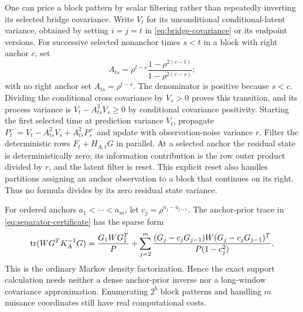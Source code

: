One can price a block pattern by scalar filtering rather than repeatedly
inverting its selected bridge covariance. Write $V_t$ for its unconditional
conditional-latent variance, obtained by setting $i=j=t$ in
\eqref{eq:bridge-covariance} or its endpoint versions. For successive selected
nonanchor times $s<t$ in a block with right anchor $c$, set
\begin{equation}\label{eq:bridge-transition}
 A_{ts}=\rho^{t-s}\frac{1-\rho^{2(c-t)}}{1-\rho^{2(c-s)}};
\end{equation}
with no right anchor set $A_{ts}=\rho^{t-s}$. The denominator is positive
because $s<c$. Dividing the conditional cross covariance by $V_s>0$
proves this transition, and its process variance is
$V_t-A_{ts}^2V_s\ge0$ by conditional covariance positivity. Starting the
first selected time at prediction variance $V_t$, propagate
$P_t^-=V_t-A_{ts}^2V_s+A_{ts}^2P_s^+$ and update with observation-noise
variance $r$. Filter the deterministic rows $F_t+H_{A,t}G$ in parallel.
At a selected anchor the residual state is deterministically zero; its
information contribution is the row outer product divided by $r$, and the
latent filter is reset. This explicit reset also handles partitions assigning
an anchor observation to a block that continues on its right. Thus no formula
divides by its zero residual state variance.

For ordered anchors $a_1<\cdots<a_m$, let
$c_j=\rho^{a_j-a_{j-1}}$. The anchor-prior trace in
\eqref{eq:separator-certificate} has the sparse form
\begin{equation}\label{eq:anchor-prior-score}
 \operatorname{tr}(WG^TK_A^{-1}G)=\frac{G_1WG_1^T}{P}
 +\sum_{j=2}^m
 \frac{(G_j-c_jG_{j-1})W(G_j-c_jG_{j-1})^T}{P(1-c_j^2)}.
\end{equation}
This is the ordinary Markov density factorization. Hence the exact
support calculation needs neither a dense anchor-prior inverse nor a
long-window covariance approximation. Enumerating $2^b$ block patterns and
handling $m$ nuisance coordinates still have real computational costs.
